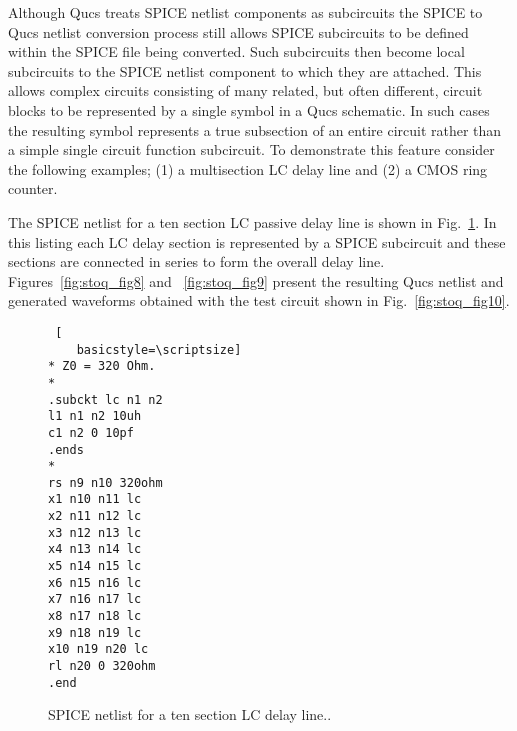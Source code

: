 
Although Qucs treats SPICE netlist components as subcircuits the SPICE to Qucs netlist conversion process still allows SPICE subcircuits to be defined within the SPICE file being converted.  Such subcircuits then become local subcircuits to the SPICE netlist component to which they are attached.  This allows complex circuits consisting of many related, but often different, circuit blocks to be represented by a single symbol in a Qucs schematic.  In such cases the resulting symbol represents a true subsection of an entire circuit rather than a simple single circuit function subcircuit. To demonstrate this feature consider the following examples; (1) a multisection LC delay line and (2) a CMOS ring counter.

The SPICE netlist for a ten section LC passive delay line is shown in Fig.~\ref{fig:stoq_fig7}. In this listing each LC delay section is represented by a SPICE subcircuit and these sections are connected in series to form the overall delay line.  Figures~\ref{fig:stoq_fig8} and ~\ref{fig:stoq_fig9} present the resulting Qucs netlist and generated waveforms obtained with the test circuit shown in Fig.~\ref{fig:stoq_fig10}.


\begin{figure}
 \begin{lstlisting} [
    basicstyle=\scriptsize]
* Z0 = 320 Ohm.
*
.subckt lc n1 n2
l1 n1 n2 10uh
c1 n2 0 10pf
.ends
*
rs n9 n10 320ohm
x1 n10 n11 lc
x2 n11 n12 lc
x3 n12 n13 lc
x4 n13 n14 lc
x5 n14 n15 lc
x6 n15 n16 lc
x7 n16 n17 lc
x8 n17 n18 lc
x9 n18 n19 lc
x10 n19 n20 lc
rl n20 0 320ohm
.end
\end{lstlisting} 
  \caption{SPICE netlist for a ten section LC delay line..}
  \label{fig:stoq_fig7}
\end{figure} 



